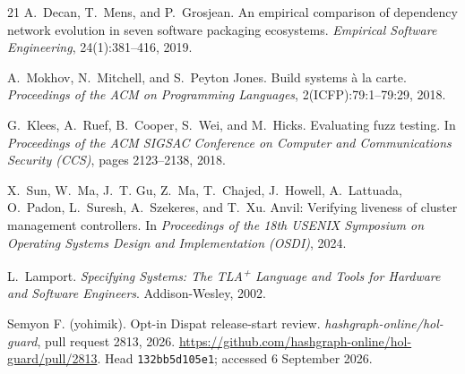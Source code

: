 \documentclass[sigconf,nonacm]{acmart}
\theoremstyle{acmplain}
\theoremstyle{acmdefinition}
\theoremstyle{acmplain}
\begin{document}
\begin{thebibliography}{21}
A.~Decan, T.~Mens, and P.~Grosjean.
An empirical comparison of dependency network evolution in seven
software packaging ecosystems.
\emph{Empirical Software Engineering}, 24(1):381--416, 2019.

A.~Mokhov, N.~Mitchell, and S.~Peyton Jones.
Build systems \`a la carte.
\emph{Proceedings of the ACM on Programming Languages},
2(ICFP):79:1--79:29, 2018.

G.~Klees, A.~Ruef, B.~Cooper, S.~Wei, and M.~Hicks.
Evaluating fuzz testing.
In \emph{Proceedings of the ACM SIGSAC Conference on Computer and
Communications Security (CCS)}, pages 2123--2138, 2018.

X.~Sun, W.~Ma, J.~T. Gu, Z.~Ma, T.~Chajed, J.~Howell, A.~Lattuada,
O.~Padon, L.~Suresh, A.~Szekeres, and T.~Xu.
Anvil: Verifying liveness of cluster management controllers.
In \emph{Proceedings of the 18th USENIX Symposium on Operating Systems
Design and Implementation (OSDI)}, 2024.

L.~Lamport.
\emph{Specifying Systems: The TLA\textsuperscript{+} Language and
Tools for Hardware and Software Engineers}.
Addison-Wesley, 2002.

Semyon F. (yohimik). Opt-in Dispat release-start review.
\emph{hashgraph-online/hol-guard}, pull request 2813, 2026.
\url{https://github.com/hashgraph-online/hol-guard/pull/2813}.
Head \texttt{132bb5d105e1}; accessed 6 September 2026.

\end{thebibliography}
\end{document}
